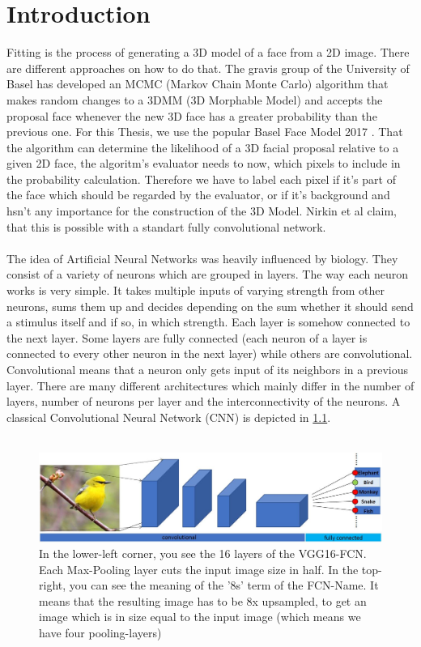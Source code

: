\chapter{Introduction}
Fitting is the process of generating a 3D model of a face from a 2D image. There are different approaches on how to do that. The gravis group of the University of Basel has developed an MCMC (Markov Chain Monte Carlo) algorithm that makes random changes to a 3DMM (3D Morphable Model) and accepts the proposal face whenever the new 3D face has a greater probability than the previous one. For this Thesis, we use the popular Basel Face Model 2017 \cite{BFM2017}. That the algorithm can determine the likelihood of a 3D facial proposal relative to a given 2D face, the algoritm's evaluator needs to now, which pixels to include in the probability calculation. Therefore we have to label each pixel if it's part of the face which should be regarded by the evaluator, or if it's background and hsn't any importance for the construction of the 3D Model. Nirkin et al \cite{nirkin2018_faceswap} claim, that this is possible with a standart fully convolutional network.\\ 
\\
The idea of Artificial Neural Networks was heavily influenced by biology. They consist of a variety of neurons which are grouped in layers. The way each neuron works is very simple. It takes multiple inputs of varying strength from other neurons, sums them up and decides depending on the sum whether it should send a stimulus itself and if so, in which strength. Each layer is somehow connected to the next layer. Some layers are fully connected (each neuron of a layer is connected to every other neuron in the next layer) while others are convolutional. Convolutional means that a neuron only gets input of its neighbors in a previous layer. There are many different architectures which mainly differ in the number of layers, number of neurons per layer and the interconnectivity of the neurons. A classical Convolutional Neural Network (CNN) is depicted in \ref{fig:test1}.\\
\\
\begin{figure}
	\centering
	\includegraphics[width=1\linewidth]{Figures/chap1/classicalCNN.JPG}
	\caption{In the lower-left corner, you see the 16 layers of the VGG16-FCN. Each Max-Pooling layer cuts the input image size in half. In the top-right, you can see the meaning of the '8s' term of the FCN-Name. It means that the resulting image has to be 8x upsampled, to get an image which is in size equal to the input image (which means we have four pooling-layers)}
	\label{fig:test1}
\end{figure}

